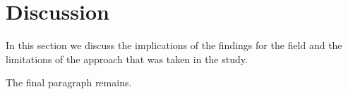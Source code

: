 \documentclass{article}
\begin{document}
\section{Discussion}
In this section we discuss the implications of the findings for the field
and the limitations of the approach that was taken in the study.

The final paragraph remains.
\end{document}
